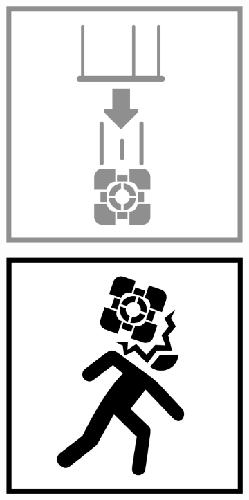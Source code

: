 \vfill

\begin{figure}[H]
  \begin{subfigure}[l]{0.195\linewidth}
    \includegraphics[width=\textwidth]{Sources/PortalIcons/d1.jpg}
  \end{subfigure}
  \begin{subfigure}[l]{0.195\linewidth}
    \includegraphics[width=\textwidth]{Sources/PortalIcons/2.jpg}

\end{subfigure}
\end{figure}
